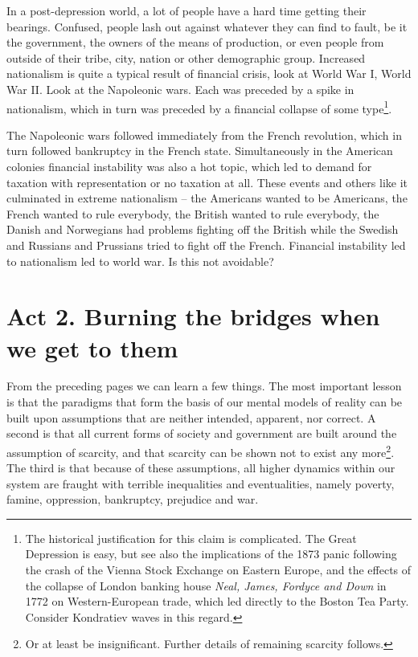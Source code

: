 In a post-depression world, a lot of people have a hard time getting their
bearings. Confused, people lash out against whatever they can f\hbox{}ind to
fault, be it the government, the owners of the means of production, or even
people from outside of their tribe, city, nation or other demographic group.
Increased nationalism is quite a typical result of f\hbox{}inancial crisis, 
look at World War I, World War II. Look at the Napoleonic wars. Each was
preceded by a spike in nationalism, which in turn was preceded by a
f\hbox{}inancial collapse of some type\footnote{The historical
justif\hbox{}ication for this claim is complicated. The Great Depression is
easy, but see also the implications of the 1873 panic following the crash of 
the Vienna Stock Exchange on Eastern Europe, and the ef\hbox{}fects of the
collapse of London banking house \textit{Neal, James, Fordyce and Down} in 1772
on Western-European trade, which led directly to the Boston Tea Party. Consider
Kondratiev waves in this regard.}.

The Napoleonic wars followed immediately from the French revolution, which in
turn followed bankruptcy in the French state. Simultaneously in the American
colonies f\hbox{}inancial instability was also a hot topic, which led to demand
for taxation with representation or no taxation at all. These events and others
like it culminated in extreme nationalism – the Americans wanted to be
Americans, the French wanted to rule everybody, the British wanted to rule
everybody, the Danish and Norwegians had problems f\hbox{}ighting of\hbox{}f 
the British while the Swedish and Russians and Prussians tried to f\hbox{}ight
of\hbox{}f the French. F\hbox{}inancial instability led to nationalism led to
world war. Is this not avoidable?


\section{Act 2. Burning the bridges when we get to them}
\label{s:artificial_scarcity:burning_bridges}

From the preceding pages we can learn a few things. The most important lesson 
is that the paradigms that form the basis of our mental models of reality can 
be built upon assumptions that are neither intended, apparent, nor correct. A
second is that all current forms of society and government are built around the
assumption of scarcity, and that scarcity can be shown not to exist any
more\footnote{Or at least be insignif\hbox{}icant. Further details of remaining
scarcity follows.}. The third is that because of these assumptions, all higher
dynamics within our system are fraught with terrible inequalities and
eventualities, namely poverty, famine, oppression, bankruptcy, prejudice and
war.


